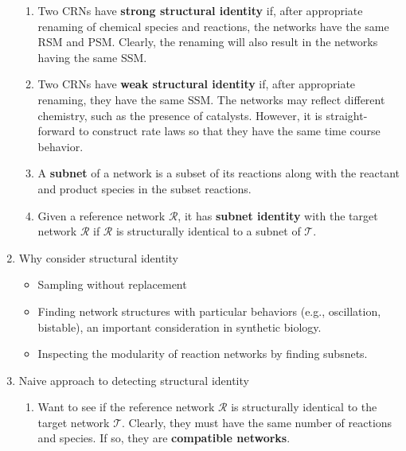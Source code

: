 \documentclass{article}
\begin{document}
\begin{enumerate}
\begin{enumerate}
        \item Two CRNs have {\bf strong structural identity} if, after appropriate renaming of chemical species and reactions, the networks have the same RSM and PSM. Clearly, the renaming will also result in the networks having the same SSM.
        
        \item Two CRNs have {\bf weak structural identity} if, after appropriate renaming, they have the same SSM. The networks may reflect different chemistry, such as the presence of catalysts. However, it is straight-forward to construct rate laws so that they have the same time course behavior.
        
        \item A {\bf subnet} of a network is a subset of its reactions along with the reactant and product species in the subset reactions.

        \item Given a reference network $\mathcal{R}$, it has {\bf subnet identity} with the target network $\mathcal{R}$ if $\mathcal{R}$ is structurally identical to a subnet of $\mathcal{T}$.
        
    \end{enumerate}
    \item Why consider structural identity
    \begin{itemize}
        \item Sampling without replacement
        \item Finding network structures with particular behaviors (e.g., oscillation, bistable), an important consideration in synthetic biology.
        \item Inspecting the modularity of reaction networks by finding subsnets.
    \end{itemize}

    \item Naive approach to detecting structural identity
    \begin{enumerate}
        \item Want to see if the reference network ${\mathcal{R}}$ is structurally identical to the target network ${\mathcal{T}}$. Clearly, they must have the same number of reactions and species. If so, they are {\bf compatible networks}.
        

\end{enumerate}
\end{enumerate}
\end{document}

